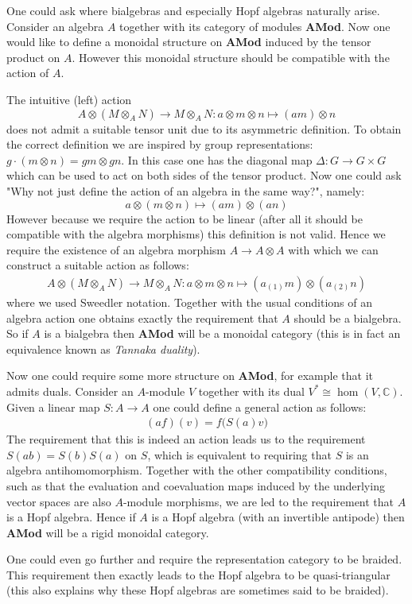 	\begin{remark}
		One could ask where bialgebras and especially Hopf algebras naturally arise. Consider an algebra $A$ together with its category of modules \textbf{AMod}. Now one would like to define a monoidal structure on \textbf{AMod} induced by the tensor product on $A$. However this monoidal structure should be compatible with the action of $A$.
		
		The intuitive (left) action \[A\otimes(M\otimes_A N)\rightarrow M\otimes_AN: a\otimes m\otimes n\mapsto (am)\otimes n\] does not admit a suitable tensor unit due to its asymmetric definition. To obtain the correct definition we are inspired by group representations: $g\cdot(m\otimes n) = gm\otimes gn$. In this case one has the diagonal map $\Delta:G\rightarrow G\times G$ which can be used to act on both sides of the tensor product. Now one could ask "Why not just define the action of an algebra in the same way?", namely:
		\[a\otimes (m\otimes n)\mapsto (am)\otimes(an)\]
		However because we require the action to be linear (after all it should be compatible with the algebra morphisms) this definition is not valid. Hence we require the existence of an algebra morphism $A\rightarrow A\otimes A$ with which we can construct a suitable action as follows:
		\begin{gather}
			A\otimes(M\otimes_AN)\rightarrow M\otimes_AN:a\otimes m\otimes n\mapsto (a_{(1)}m)\otimes(a_{(2)}n)
		\end{gather}
		where we used Sweedler notation. Together with the usual conditions of an algebra action one obtains exactly the requirement that $A$ should be a bialgebra. So if $A$ is a bialgebra then \textbf{AMod} will be a monoidal category (this is in fact an equivalence known as \textit{Tannaka duality}).
		
		Now one could require some more structure on \textbf{AMod}, for example that it admits duals. Consider an $A$-module $V$ together with its dual $V^*\cong\hom(V, \mathbb{C})$. Given a linear map $S:A\rightarrow A$ one could define a general action as follows:
		\begin{gather}
			(af)(v) = f\big(S(a)v\big)
		\end{gather}
		The requirement that this is indeed an action leads us to the requirement $S(ab) = S(b)S(a)$ on $S$, which is equivalent to requiring that $S$ is an algebra antihomomorphism. Together with the other compatibility conditions, such as that the evaluation and coevaluation maps induced by the underlying vector spaces are also $A$-module morphisms, we are led to the requirement that $A$ is a Hopf algebra. Hence if $A$ is a Hopf algebra (with an invertible antipode) then \textbf{AMod} will be a rigid monoidal category.
		
		One could even go further and require the representation category to be braided. This requirement then exactly leads to the Hopf algebra to be quasi-triangular (this also explains why these Hopf algebras are sometimes said to be braided).
	\end{remark}
	
